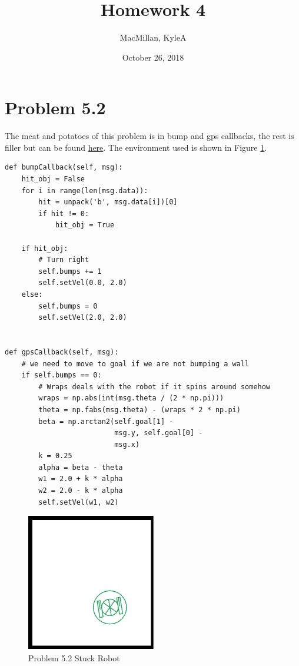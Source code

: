 \documentclass{article}
\title{\textbf{Homework 4}}
\author{MacMillan, KyleA}
\date{October 26, 2018}
\begin{document}
\maketitle

\newpage
\tableofcontents
{}
\newpage
\listoffigures
{}



\newpage
\hypersetup{
    colorlinks,
    citecolor=blue,
    filecolor=black,
    linkcolor=blue,
    urlcolor=blue
}

\setcounter{page}{1}
\newpage
\section{\textbf{Problem 5.2}}
The meat and potatoes of this problem is in bump and gps callbacks, the 
rest is filler but can be found \href{https://github.com/macattackftw/RoboticsHW/blob/master/HW4/Problem2.py}{here}. The environment used is shown in Figure \ref{fig:stuck1}.

\begin{verbatim}
def bumpCallback(self, msg):
    hit_obj = False
    for i in range(len(msg.data)):
        hit = unpack('b', msg.data[i])[0]
        if hit != 0:
            hit_obj = True

    if hit_obj:
        # Turn right
        self.bumps += 1
        self.setVel(0.0, 2.0)
    else:
        self.bumps = 0
        self.setVel(2.0, 2.0)


def gpsCallback(self, msg):
    # we need to move to goal if we are not bumping a wall
    if self.bumps == 0:
        # Wraps deals with the robot if it spins around somehow
        wraps = np.abs(int(msg.theta / (2 * np.pi)))
        theta = np.fabs(msg.theta) - (wraps * 2 * np.pi)
        beta = np.arctan2(self.goal[1] -
                          msg.y, self.goal[0] -
                          msg.x)
        k = 0.25
        alpha = beta - theta
        w1 = 2.0 + k * alpha
        w2 = 2.0 - k * alpha
        self.setVel(w1, w2)

\end{verbatim}

\begin{figure}[h]
    \centering
    \includegraphics[pages=1]{stuck1}
    \caption{Problem 5.2 Stuck Robot}
    \label{fig:stuck1}
\end{figure}
\end{document}
